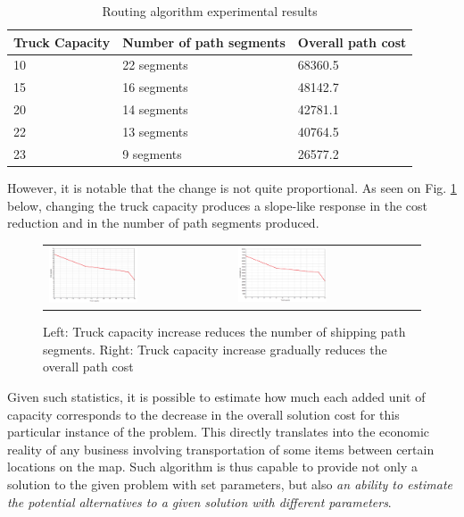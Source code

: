\documentclass[journal,onecolumn]{IEEEtran}
\begin{document}
\begin{table}[h]
\centering
\caption{Routing algorithm experimental results} 
\label{tab:tab1}
	\begin{tabular}{ | l | l | l |}
 		\hline
 		Truck Capacity & Number of path segments & Overall path cost \\ \hline
 		10 & 22 segments & 68360.5  \\ \hline
		15 & 16 segments & 48142.7 \\ \hline
		20 & 14 segments & 42781.1  \\ \hline
		22 & 13 segments & 40764.5 \\ \hline
		23 & 9 segments & 26577.2 \\ \hline
	\end{tabular}
\end{table}

However, it is notable that the change is not quite proportional. As seen on Fig. \ref{fig:img2} below, changing the truck capacity produces a slope-like response in the cost reduction and in the number of path segments produced.

\begin{figure}[h]
\begin{tabular}{ll}
\includegraphics[width=0.5\textwidth]{img/img2.png}
&
\includegraphics[width=0.5\textwidth]{img/img3.png}
\end{tabular}
\caption{Left: Truck capacity increase reduces the number of shipping path segments.
Right: Truck capacity increase gradually reduces the overall path cost}
\label{fig:img2}
\end{figure}

Given such statistics, it is possible to estimate how much each added unit of capacity corresponds to the decrease in the overall solution cost for this particular instance of the problem. This directly translates into the economic reality of any business involving transportation of some items between certain locations on the map. Such algorithm is thus capable to provide not only a solution to the given problem with set parameters, but also \textit{an ability to estimate the potential alternatives to a given solution with different parameters}. 
\end{document}
